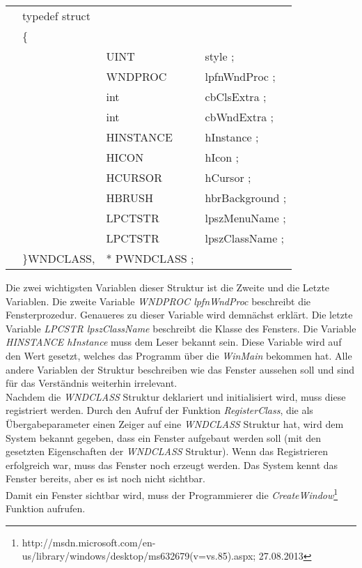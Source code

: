 \begin{tabular}{llll}
& typedef struct\\
& \{\\
& & UINT        & style ;\\
& & WNDPROC     & lpfnWndProc ;\\
& & int         & cbClsExtra ;\\
& & int         & cbWndExtra ;\\
& & HINSTANCE   & hInstance ;\\
& & HICON       & hIcon ;\\
& & HCURSOR     & hCursor ;\\
& & HBRUSH      & hbrBackground ;\\
& & LPCTSTR     & lpszMenuName ;\\
& & LPCTSTR     & lpszClassName ;\\
&\}WNDCLASS,&* PWNDCLASS ;
\end{tabular}

Die zwei wichtigsten Variablen dieser Struktur ist die Zweite und die Letzte Variablen. Die zweite Variable \textit{WNDPROC lpfnWndProc} beschreibt die Fensterprozedur. Genaueres zu dieser Variable wird demnächst erklärt. Die letzte Variable \textit{LPCSTR lpszClassName} beschreibt die Klasse des Fensters. Die Variable \textit{HINSTANCE hInstance} muss dem Leser bekannt sein. Diese Variable wird auf den Wert gesetzt, welches das Programm über die \textit{WinMain} bekommen hat. Alle andere Variablen der Struktur beschreiben wie das Fenster aussehen soll und sind für das Verständnis weiterhin irrelevant.\\

Nachdem die \textit{WNDCLASS} Struktur deklariert und initialisiert wird, muss diese registriert werden. Durch den Aufruf der Funktion \textit{RegisterClass}, die als Übergabeparameter einen Zeiger auf eine \textit{WNDCLASS} Struktur hat, wird dem System bekannt gegeben, dass ein Fenster aufgebaut werden soll (mit den gesetzten Eigenschaften der \textit{WNDCLASS} Struktur). Wenn das Registrieren erfolgreich war, muss das Fenster noch erzeugt werden. Das System kennt das Fenster bereits, aber es ist noch nicht sichtbar.\\

Damit ein Fenster sichtbar wird, muss der Programmierer die \textit{CreateWindow}\footnote{http://msdn.microsoft.com/en-us/library/windows/desktop/ms632679(v=vs.85).aspx; 27.08.2013} Funktion aufrufen. 


